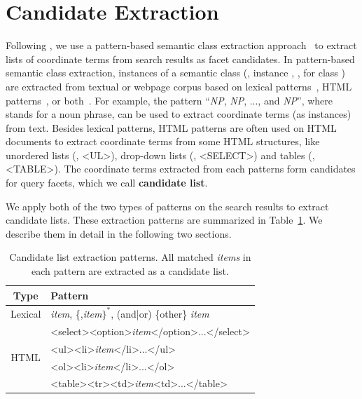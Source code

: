 \section{Candidate Extraction}
\label{sec:facet-candidate}
Following \citet{dou2011finding}, we use a pattern-based semantic class extraction approach~\cite{shi2010corpus} to extract lists of coordinate terms from search results as facet candidates. In pattern-based semantic class extraction, instances of a semantic class (\eg, instance , ,  for class ) are extracted from textual or webpage corpus based on lexical patterns~\cite{hearst1992automatic,pasca2004acquisition}, HTML patterns~\cite{shinzato2005simple}, or both~\cite{shi2008pattern,zhang2009employing}. For example, the pattern ``\textit{NP}, \textit{NP}, ..., and \textit{NP}'', where  stands for a noun phrase, can be used to extract coordinate terms (as instances) from text. Besides lexical patterns, HTML patterns are often used on HTML documents to extract coordinate terms from some HTML structures, like unordered lists (\ie, <UL>), drop-down lists (\ie, <SELECT>) and 
tables (\ie, <TABLE>). The coordinate terms extracted from each patterns form candidates for query facets, which we call \textbf{candidate list}.

We apply both of the two types of patterns on the search results to extract candidate lists. These extraction patterns are summarized in Table~\ref{tab:facet-patterns}. We describe them in detail in the following two sections.

\begin{table}[H]
\centering
\caption{Candidate list extraction patterns. All matched \textit{items} in each pattern are extracted as a candidate list.}
\label{tab:facet-patterns}
\begin{tabular}{|c|l|} \hline
Type& Pattern\\ \hline
Lexical & \textit{item}, \{,\textit{item}$\}^*$, (and|or) \{other\} \textit{item} \\  \hline
\multirow{4}{*}{HTML}
& <select><option>\textit{item}</option>...</select>\\\cline{2-2}
& <ul><li>\textit{item}</li>...</ul>\\\cline{2-2}
& <ol><li>\textit{item}</li>...</ol>\\\cline{2-2}
& <table><tr><td>\textit{item}<td>...</table>\\ \hline
\end{tabular}
\end{table}

